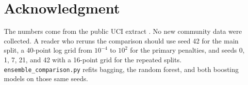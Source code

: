 \documentclass[conference]{IEEEtran}
\begin{document}
\section*{Acknowledgment}
The numbers come from the public UCI extract \cite{uci2009}.
No new community data were collected.
A reader who reruns the comparison should use seed 42 for the main split, a 40-point log grid from $10^{-4}$ to $10^{2}$ for the primary penalties, and seeds 0, 1, 7, 21, and 42 with a 16-point grid for the repeated splits.
\texttt{ensemble\_comparison.py} refits bagging, the random forest, and both boosting models on those same seeds.



\end{document}
